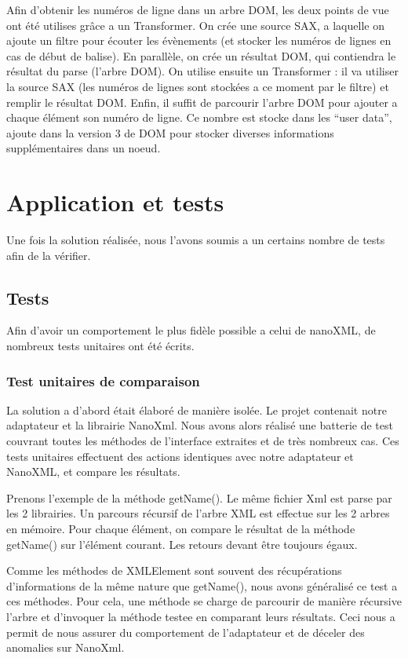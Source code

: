 Afin d'obtenir les numéros de ligne dans un arbre DOM, les deux points de vue ont été utilises grâce a un Transformer.
On crée une source SAX, a laquelle on ajoute un filtre pour écouter les évènements (et stocker les numéros de lignes en cas de début de balise).
En parallèle, on crée un résultat DOM, qui contiendra le résultat du parse (l'arbre DOM).
On utilise ensuite un Transformer : il va utiliser la source SAX (les numéros de lignes sont stockées a ce moment par le filtre) et remplir le résultat DOM.
Enfin, il suffit de parcourir l'arbre DOM pour ajouter a chaque élément son numéro de ligne.
Ce nombre est stocke dans les ``user data'', ajoute dans la version 3  de DOM pour stocker diverses informations supplémentaires dans un noeud.
\section{Application et tests}
Une fois la solution réalisée, nous l'avons soumis a un certains nombre de tests afin de la vérifier.
\subsection{Tests}
Afin d'avoir un comportement le plus fidèle possible a celui de nanoXML, de nombreux tests unitaires ont été écrits.
\subsubsection{Test unitaires de comparaison}
La solution a d'abord était élaboré de manière isolée. Le projet contenait notre adaptateur et la librairie NanoXml. Nous avons alors réalisé une batterie de test couvrant toutes les méthodes de l'interface extraites et de très nombreux cas. Ces tests unitaires effectuent des actions identiques avec notre adaptateur et NanoXML, et compare les résultats. 

Prenons l'exemple de la méthode getName(). Le même fichier Xml est parse par les 2 librairies. Un parcours récursif de l'arbre XML est effectue sur les 2 arbres en mémoire. Pour chaque élément, on compare le résultat de la méthode getName() sur l'élément courant. Les retours devant être toujours égaux.

Comme les méthodes de XMLElement sont souvent des récupérations d'informations de la même nature que getName(), nous avons généralisé ce test a ces méthodes. Pour cela, une méthode se charge de parcourir de manière récursive l'arbre et d'invoquer la méthode testee en comparant leurs résultats. Ceci nous a permit de nous assurer du comportement de l'adaptateur et de déceler des anomalies sur NanoXml.

